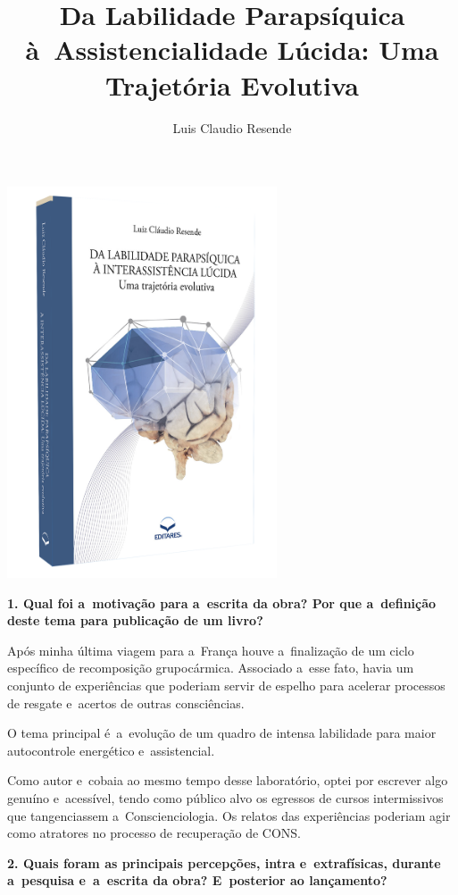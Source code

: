 \documentclass{gescons}
\author{Luis Claudio Resende}
\title{Da Labilidade Parapsíquica à~Assistencialidade Lúcida: Uma Trajetória Evolutiva}
\begin{document}
    \makeentrevistatitle

    \begin{multicols}{2}


\begin{center}
    \includegraphics[width=8cm]{articles/entrevista/mockups/Luis_Claudio_Resende-Labilidade.png}
\end{center}

\textbf{1. Qual foi a~motivação para a~escrita da obra? Por que a~definição deste tema para publicação de um livro? }

Após minha última viagem para a~França houve a~finalização de um ciclo específico de recomposição grupocármica.  Associado a~esse fato, havia um conjunto de experiências que poderiam servir de espelho para acelerar processos de resgate e~acertos de outras consciências.

O tema principal é~a~evolução de um quadro de intensa labilidade para maior autocontrole energético e~assistencial. 

Como autor e~cobaia ao mesmo tempo desse laboratório, optei por escrever algo genuíno e~acessível, tendo como público alvo os egressos de cursos intermissivos que tangenciassem a~Conscienciologia.  Os relatos das experiências poderiam agir como atratores no processo de recuperação de CONS.

\textbf{2.       Quais foram as principais percepções, intra e~extrafísicas, durante a~pesquisa e~a~escrita da obra? E~posterior ao lançamento?}


\end{multicols}
\end{document}
